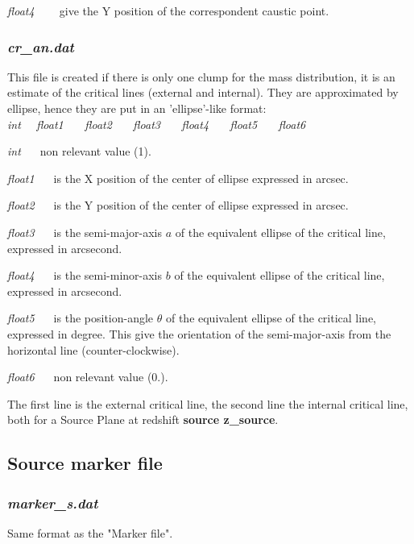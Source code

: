 {\sl float4 \ \ \ } give the Y position of the correspondent caustic point.


\subsubsection{\sl cr{\_}an.dat \ \ \ }

This file is created if there is only one clump for the mass distribution,
it is an estimate of the critical lines (external and internal). They are
approximated by ellipse, hence they are put in an 'ellipse'-like format:\\

{\sl int \ \  float1 \ \ \ float2 \ \ \ float3 \ \ \ float4
\ \ \ float5 \ \ \ float6}

{\sl int \ \ } non relevant value (1).

{\sl float1 \ \ } is the X position of the center of ellipse expressed
in arcsec.

{\sl float2 \ \ } is the Y position of the center of ellipse expressed
in arcsec.

{\sl float3 \ \ } is the semi-major-axis $a$ of the equivalent ellipse of the 
critical line, expressed in arcsecond.

{\sl float4 \ \ } is the semi-minor-axis $b$ of the equivalent ellipse of the 
critical line, expressed in arcsecond.

{\sl float5 \ \ } is the position-angle $\theta$ of the equivalent
ellipse of the critical line, expressed in degree. This give the
orientation of the semi-major-axis
from the horizontal line (counter-clockwise).

{\sl float6 \ \ } non relevant value (0.).

\vspace{1cm}
The first line is the external critical line, the second line the internal
critical line, both for a Source Plane at redshift {\bf source z\_source}.\\

\subsection{Source marker file}

\subsubsection{\sl marker{\_}s.dat \ \ \ }

Same format as the "Marker file".

